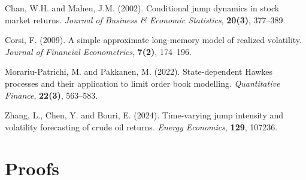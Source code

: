 \documentclass[11pt]{article}
\begin{document}
\begin{thebibliography}{}

 Chan, W.H. and Maheu, J.M. (2002). Conditional jump dynamics in stock market returns. \textit{Journal of Business \& Economic Statistics}, \textbf{20(3)}, 377--389.

 Corsi, F. (2009). A simple approximate long-memory model of realized volatility. \textit{Journal of Financial Econometrics}, \textbf{7(2)}, 174--196.

 Morariu-Patrichi, M. and Pakkanen, M. (2022). State-dependent Hawkes processes and their application to limit order book modelling. \textit{Quantitative Finance}, \textbf{22(3)}, 563--583.

 Zhang, L., Chen, Y. and Bouri, E. (2024). Time-varying jump intensity and volatility forecasting of crude oil returns. \textit{Energy Economics}, \textbf{129}, 107236.



\end{thebibliography}

\appendix

\section{Proofs}
\end{document}
